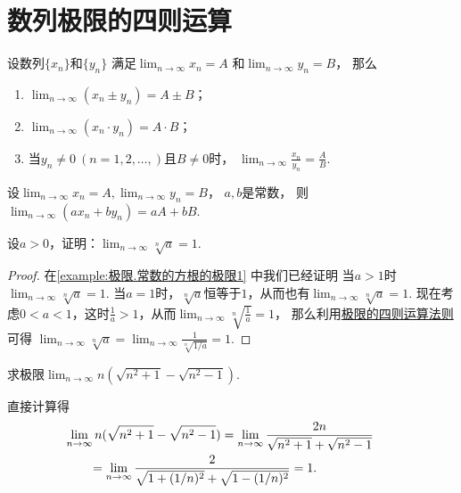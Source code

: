 \section{数列极限的四则运算}
\begin{theorem}\label{theorem:极限.数列极限的四则运算法则}
设数列\(\{x_n\}\)和\(\{y_n\}\)
满足\(\lim_{n\to\infty} x_n = A\)
和\(\lim_{n\to\infty} y_n = B\)，
那么\begin{enumerate}
	\item \(\lim_{n\to\infty} (x_n \pm y_n) = A \pm B\)；
	\item \(\lim_{n\to\infty} (x_n \cdot y_n) = A \cdot B\)；
	\item 当\(y_n \neq 0\ (n=1,2,\dotsc,)\)且\(B \neq 0\)时，
	\(\lim_{n\to\infty}{\frac{x_n}{y_n}}=\frac{A}{B}\).
\end{enumerate}
\end{theorem}

\begin{corollary}
设\(\lim_{n\to\infty} x_n = A,
\lim_{n\to\infty} y_n = B\)，
\(a,b\)是常数，
则\(\lim_{n\to\infty} (a x_n + b y_n) = a A + b B\).
\end{corollary}

\begin{example}\label{example:极限.常数的方根的极限2}
设\(a>0\)，证明：\(\lim_{n\to\infty} \sqrt[n]{a} = 1\).
\begin{proof}
在\cref{example:极限.常数的方根的极限1} 中我们已经证明
当\(a>1\)时\(\lim_{n\to\infty} \sqrt[n]{a} = 1\).
当\(a=1\)时，\(\sqrt[n]{a}\)恒等于\(1\)，从而也有\(\lim_{n\to\infty} \sqrt[n]{a} = 1\).
现在考虑\(0<a<1\)，这时\(\frac1a>1\)，从而\(\lim_{n\to\infty} \sqrt[n]{\frac1a} = 1\)，
那么利用\hyperref[theorem:极限.数列极限的四则运算法则]{极限的四则运算法则}可得
\(\lim_{n\to\infty} \sqrt[n]{a}
= \lim_{n\to\infty} \frac1{\sqrt[n]{1/a}} = 1\).
\end{proof}
\end{example}

\begin{example}
求极限\(\lim_{n\to\infty} n(\sqrt{n^2+1}-\sqrt{n^2-1})\).
\begin{solution}
直接计算得\begin{align*}
	&\hspace{-20pt}
	\lim_{n\to\infty} n(\sqrt{n^2+1}-\sqrt{n^2-1})
	= \lim_{n\to\infty} \frac{2n}{\sqrt{n^2+1}+\sqrt{n^2-1}} \\ %
	&= \lim_{n\to\infty} \frac2{\sqrt{1+(1/n)^2}+\sqrt{1-(1/n)^2}} %
	= 1.
\end{align*}
\end{solution}
\end{example}

